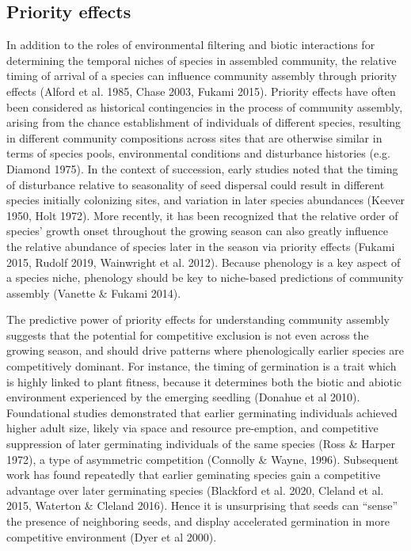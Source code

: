 \documentclass[11pt]{article}
\begin{document}
\subsection*{Priority effects}

In addition to the roles of environmental filtering and biotic interactions for determining the temporal niches of species in assembled community, the relative timing of arrival of a species can influence community assembly through priority effects (Alford et al. 1985, Chase 2003, Fukami 2015). Priority effects have often been considered as historical contingencies in the process of community assembly, arising from the chance establishment of individuals of different species, resulting in different community compositions across sites that are otherwise similar in terms of species pools, environmental conditions and disturbance histories (e.g. Diamond 1975). In the context of succession, early studies noted that the timing of disturbance relative to seasonality of seed dispersal could result in different species initially colonizing sites, and variation in later species abundances (Keever 1950, Holt 1972). More recently, it has been recognized that the relative order of species’ growth onset throughout the growing season can also greatly influence the relative abundance of species later in the season via priority effects (Fukami 2015, Rudolf 2019, Wainwright et al. 2012). Because phenology is a key aspect of a species niche, phenology should be key to niche-based predictions of community assembly (Vanette \& Fukami 2014).

The predictive power of priority effects for understanding community assembly suggests that the potential for competitive exclusion is not even across the growing season, and should drive patterns where phenologically earlier species are competitively dominant. For instance, the timing of germination is a trait which is highly linked to plant fitness, because it determines both the biotic and abiotic environment experienced by the emerging seedling (Donahue et al 2010). Foundational studies demonstrated that earlier germinating individuals achieved higher adult size, likely via space and resource pre-emption, and competitive suppression of later germinating individuals of the same species (Ross \& Harper 1972), a type of asymmetric competition (Connolly \& Wayne, 1996). Subsequent work has found repeatedly that earlier geminating species gain a competitive advantage over later germinating species (Blackford et al. 2020, Cleland et al. 2015, Waterton \& Cleland 2016). Hence it is unsurprising that seeds can “sense” the presence of neighboring seeds, and display accelerated germination in more competitive environment (Dyer et al 2000).
\end{document}
